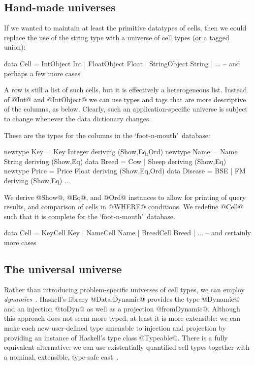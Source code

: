 \documentclass[nocopyrightspace,preprint]{sigplan-proc}
\newcommand{\fm}{`foot-n-mouth'}
\begin{document}
\medskip

\subsection*{Hand-made universes}

If we wanted to maintain at least the primitive datatypes of cells,
then we could replace the use of the string type with a universe of
cell types (or a tagged union):

\begin{code}
 data Cell = IntObject     Int
           | FloatObject   Float
           | StringObject  String
           | ... -- and perhaps a few more cases
\end{code}

A row is still a list of such cells, but it is effectively a
heterogeneous list. Instead of @Int@ and @IntObject@ we can use types
and tags that are more descriptive of the columns, as below.  Clearly,
such an application-specific universe is subject to change whenever
the data dictionary changes.

These are the types for the columns in the \fm\ database:

\begin{code}
 newtype Key   = Key Integer  deriving (Show,Eq,Ord)
 newtype Name  = Name String  deriving (Show,Eq)
 data Breed    = Cow | Sheep  deriving (Show,Eq)
 newtype Price = Price Float  deriving (Show,Eq,Ord)
 data Disease  = BSE | FM     deriving (Show,Eq)
 ...
\end{code}

We derive @Show@, @Eq@, and @Ord@ instances to allow for printing of
query results, and comparison of cells in @WHERE@ conditions. We
redefine @Cell@ such that it is complete for the \fm\ database.

\begin{code}
 data Cell = KeyCell   Key 
           | NameCell  Name
           | BreedCell Breed
           | ... -- and certainly more cases
\end{code}

\medskip

\subsection*{The universal universe}

Rather than introducing problem-specific universes of cell types, we can
employ \emph{dynamics}~\cite{ACPP89,ACPR92}. Haskell's library
@Data.Dynamic@ provides the type @Dynamic@ and an injection
@toDyn@ as well as a projection @fromDynamic@. Although 
this approach does not seem more typed, at least it is more extensible: we can
make each new user-defined type amenable to injection and projection
by providing an instance of Haskell's type class @Typeable@. There is
a fully equivalent alternative: we can use existentially quantified
cell types together with a nominal, extensible, type-safe
cast~\cite{LPJ03}.
\end{document}
